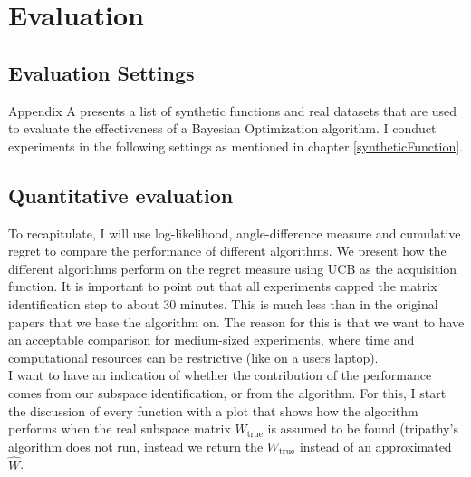 \chapter{Evaluation}

\ifpdf
    \graphicspath{{07_Chapter6/Figs/Raster/}{07_Chapter6/Figs/PDF/}{07_Chapter6/Figs/}}
\else
    \graphicspath{{07_Chapter6/Figs/Vector/}{07_Chapter6/Figs/}}
\fi

\section{Evaluation Settings}

Appendix A presents a list of synthetic functions and real datasets that are used to evaluate the effectiveness of a Bayesian Optimization algorithm. 
I conduct experiments in the following settings as mentioned in chapter \ref{syntheticFunction}.

\section{Quantitative evaluation}
To recapitulate, I will use log-likelihood, angle-difference measure and cumulative regret to compare the performance of different algorithms.
We present how the different algorithms perform on the regret measure using UCB as the acquisition function.
It is important to point out that all experiments capped the matrix identification step to about 30 minutes.
This is much less than in the original papers that we base the algorithm on.
The reason for this is that we want to have an acceptable comparison for medium-sized experiments, where time and computational resources can be restrictive (like on a users laptop). \\

I want to have an indication of whether the contribution of the performance comes from our subspace identification, or from the algorithm. 
For this, I start the discussion of every function with a plot that shows how the algorithm performs when the real subspace matrix $W_{\text{true}}$ is assumed to be found (tripathy's algorithm does not run, instead we return the $W_{\text{true}}$ instead of an approximated $\hat{W}$. \\

